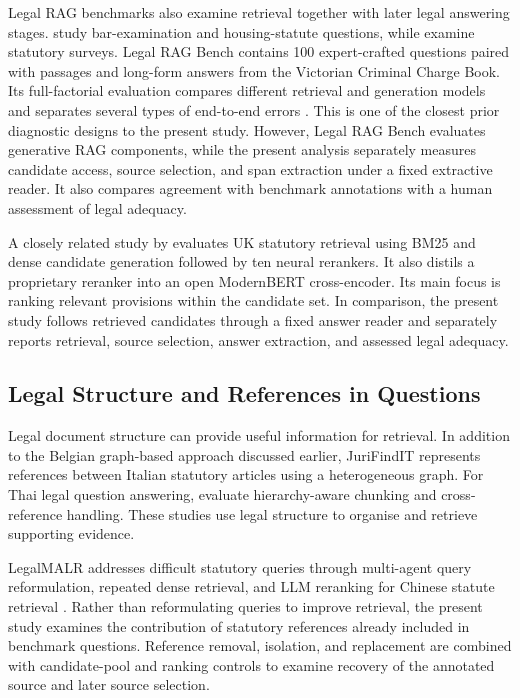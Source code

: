 \documentclass[pdflatex,sn-basic]{sn-jnl}%
\theoremstyle{thmstyleone}%
\theoremstyle{thmstyletwo}%
\theoremstyle{thmstylethree}%
\begin{document}
Legal RAG benchmarks also examine retrieval together with later legal answering
stages. \citet{zhengReasoningFocusedLegalRetrieval2025} study bar-examination
and housing-statute questions, while
\citet{afaneBenchmarkingLegalRAG2026} examine statutory surveys. Legal RAG
Bench contains 100 expert-crafted questions paired with passages and long-form
answers from the Victorian Criminal Charge Book. Its full-factorial evaluation
compares different retrieval and generation models and separates several types
of end-to-end errors \citep{butler2026legalragbench}. This is one of the
closest prior diagnostic designs to the present study. However, Legal RAG Bench
evaluates generative RAG components, while the present analysis separately
measures candidate access, source selection, and span extraction under a fixed
extractive reader. It also compares agreement with benchmark annotations with
a human assessment of legal adequacy.

A closely related study by \citet{alshehri2026neural} evaluates UK statutory
retrieval using BM25 and dense candidate generation followed by ten neural
rerankers. It also distils a proprietary reranker into an open ModernBERT
cross-encoder. Its main focus is ranking relevant provisions within the
candidate set. In comparison, the present study follows retrieved candidates
through a fixed answer reader and separately reports retrieval, source
selection, answer extraction, and assessed legal adequacy.

\subsection{Legal Structure and References in Questions}

Legal document structure can provide useful information for retrieval. In
addition to the Belgian graph-based approach discussed earlier, JuriFindIT
\citep{noceJuriFindITItalian2026} represents references between Italian
statutory articles using a heterogeneous graph. For Thai legal question
answering, \citet{akarajaradwongNitiBench2025} evaluate hierarchy-aware
chunking and cross-reference handling. These studies use legal structure to
organise and retrieve supporting evidence.

LegalMALR addresses difficult statutory queries through multi-agent query
reformulation, repeated dense retrieval, and LLM reranking for Chinese statute
retrieval \citep{li2026legalmalr}. Rather than reformulating queries to improve
retrieval, the present study examines the contribution of statutory references
already included in benchmark questions. Reference removal, isolation, and
replacement are combined with candidate-pool and ranking controls to examine
recovery of the annotated source and later source selection.
\end{document}
